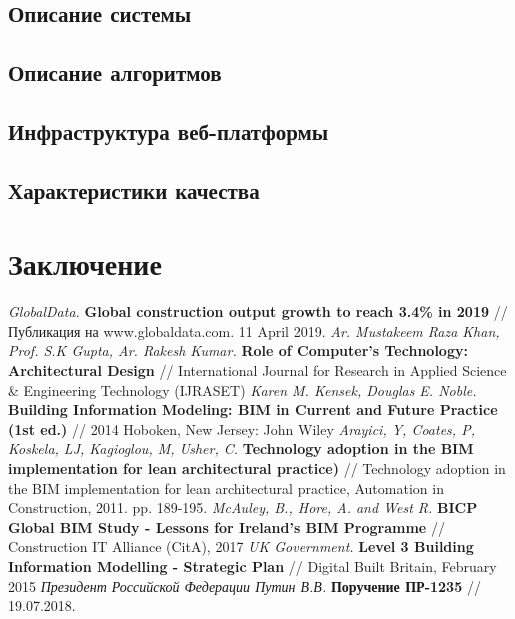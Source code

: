 \documentclass[a4paper,14pt]{extreport} %
\begin{document}
\newpage
\section{Описание системы}


\newpage
\section{Описание алгоритмов}


\newpage
\section{Инфраструктура веб-платформы}


\newpage
\section{Характеристики качества}


\newpage
\chapter{Заключение}

\begin{thebibliography}{1}
{\small
{} {\it GlobalData.}
\textbf{Global construction output growth to reach 3.4\% in 2019} // Публикация на www.globaldata.com. 11 April 2019.
 \textit{Ar. Mustakeem Raza Khan, Prof. S.K Gupta, Ar. Rakesh Kumar.}
\textbf{Role of Computer’s Technology: Architectural Design} // International Journal for Research in Applied Science \& Engineering Technology (IJRASET)
 {\it Karen M. Kensek, Douglas E. Noble.}
\textbf{Building Information Modeling: BIM in Current and Future Practice (1st ed.)} // 2014 Hoboken, New Jersey: John Wiley
 {\it Arayici, Y, Coates, P, Koskela, LJ, Kagioglou, M, Usher, C.}
\textbf{Technology adoption in the BIM implementation for lean architectural practice)} // Technology adoption in the BIM implementation for lean architectural practice, Automation in Construction, 2011. pp. 189-195.
 {\it McAuley, B., Hore, A. and West R.}
\textbf{BICP Global BIM Study - Lessons for Ireland’s BIM Programme} // Construction IT Alliance (CitA), 2017
 {\it UK Government.}
\textbf{Level 3 Building Information Modelling - Strategic Plan} // Digital Built Britain, February 2015
 {\it Президент Российской Федерации Путин В.В.}
\textbf{Поручение ПР-1235} // 19.07.2018.
}
\end{thebibliography}
\end{document}
